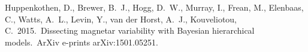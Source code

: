 \documentclass[a4paper, 11pt]{article}
\begin{document}
\begin{thebibliography}{}
 Huppenkothen, D., 
Brewer, B.~J., Hogg, D.~W., Murray, I., Frean, M., Elenbaas, C., Watts, 
A.~L., Levin, Y., van der Horst, A.~J., Kouveliotou, C.\ 2015.\ Dissecting 
magnetar variability with Bayesian hierarchical models.\ ArXiv e-prints 
arXiv:1501.05251.
\end{thebibliography}
\end{document}
